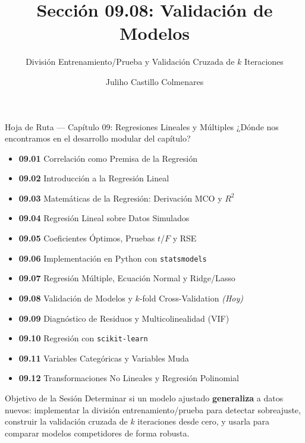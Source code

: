 \documentclass[10pt, aspectratio=169]{beamer}
\title[Validación de Modelos]{Sección 09.08: Validación de Modelos}
\subtitle{División Entrenamiento/Prueba y Validación Cruzada de $k$ Iteraciones}
\author[J. Castillo Colmenares]{Juliho Castillo Colmenares}
\institute{Tecnológico de Monterrey}
\date{\vspace{-1.2cm}}
\begin{document}
\begin{frame}[plain]
  \vspace{-0.8cm}
  \titlepage
\end{frame}

\begin{frame}{Hoja de Ruta --- Capítulo 09: Regresiones Lineales y Múltiples}
  \scriptsize
  ¿Dónde nos encontramos en el desarrollo modular del capítulo?
  \begin{itemize}\itemsep=0.02em
    \item \textbf{09.01} Correlación como Premisa de la Regresión
    \item \textbf{09.02} Introducción a la Regresión Lineal
    \item \textbf{09.03} Matemáticas de la Regresión: Derivación MCO y $R^2$
    \item \textbf{09.04} Regresión Lineal sobre Datos Simulados
    \item \textbf{09.05} Coeficientes Óptimos, Pruebas $t$/$F$ y RSE
    \item \textbf{09.06} Implementación en Python con \texttt{statsmodels}
    \item \textbf{09.07} Regresión Múltiple, Ecuación Normal y Ridge/Lasso
    \item \textbf{09.08} Validación de Modelos y $k$-fold Cross-Validation \emph{(Hoy)}
    \item \textbf{09.09} Diagnóstico de Residuos y Multicolinealidad (VIF)
    \item \textbf{09.10} Regresión con \texttt{scikit-learn}
    \item \textbf{09.11} Variables Categóricas y Variables Muda
    \item \textbf{09.12} Transformaciones No Lineales y Regresión Polinomial
  \end{itemize}
  \pause
  \vspace{-0.05cm}
  \begin{block}{Objetivo de la Sesión}
    Determinar si un modelo ajustado \textbf{generaliza} a datos nuevos: implementar la división entrenamiento/prueba para detectar sobreajuste, construir la validación cruzada de $k$ iteraciones desde cero, y usarla para comparar modelos competidores de forma robusta.
  \end{block}
\end{frame}
\end{document}
